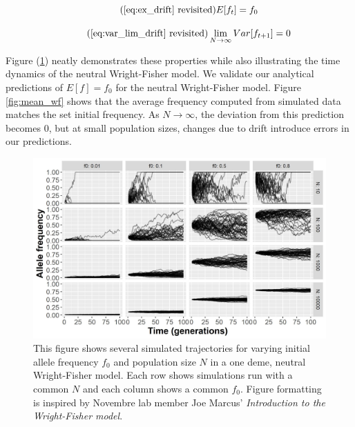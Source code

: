 \begin{equation}
    \tag{\ref{eq:ex_drift} revisited}
    E[f_t] = f_0
\end{equation}

\begin{equation}
    \tag{\ref{eq:var_lim_drift} revisited}
    \lim_{N \to \infty} Var[f_{t+1}] = 0
\end{equation}


Figure (\ref{fig:neutral_wf}) neatly demonstrates these properties while also illustrating the time dynamics of the neutral Wright-Fisher model. We validate our analytical predictions of $E[f] = f_0$ for the neutral Wright-Fisher model. Figure \ref{fig:mean_wf} shows that the average frequency computed from simulated data matches the set initial frequency. As $N \to \infty$, the deviation from this prediction becomes $0$, but at small population sizes, changes due to drift introduce errors in our predictions. 


\begin{figure}[h]
    \centering
    \includegraphics[scale=0.8]{img/neutral_wf.jpg}
    \caption{This figure shows several simulated trajectories for varying initial allele frequency $f_0$ and population size $N$ in a one deme, neutral Wright-Fisher model. Each row shows simulations run with a common $N$ and each column shows a common $f_0$. Figure formatting is inspired by Novembre lab member Joe Marcus' \textit{Introduction to the Wright-Fisher model}.\cite{marcus_introduction_2016}}
    \label{fig:neutral_wf}
\end{figure}


